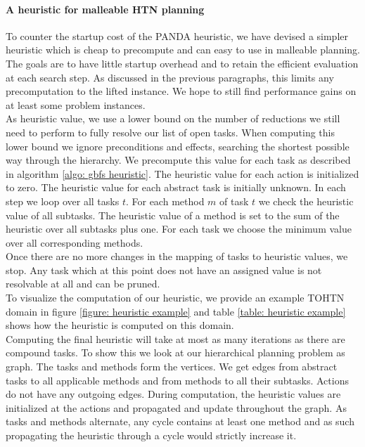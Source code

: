 \paragraph{A heuristic for malleable HTN planning}
To counter the startup cost of the PANDA heuristic, we have devised a simpler heuristic which is cheap to precompute and can easy to use in malleable planning. The goals are to have little startup overhead and to retain the efficient evaluation at each search step. As discussed in the previous paragraphs, this limits any precomputation to the lifted instance. We hope to still find performance gains on at least some problem instances. \\
As heuristic value, we use a lower bound on the number of reductions we still need to perform to fully resolve our list of open tasks. When computing this lower bound we ignore preconditions and effects, searching the shortest possible way through the hierarchy. We precompute this value for each task as described in algorithm \ref{algo: gbfs heuristic}. The heuristic value for each action is initialized to zero. The heuristic value for each abstract task is initially unknown. In each step we loop over all tasks $t$. For each method $m$ of task $t$ we check the heuristic value of all subtasks. The heuristic value of a method is set to the sum of the heuristic over all subtasks plus one. For each task we choose the minimum value over all corresponding methods. \\
Once there are no more changes in the mapping of tasks to heuristic values, we stop. Any task which at this point does not have an assigned value is not resolvable at all and can be pruned. \\
To visualize the computation of our heuristic, we provide an example TOHTN domain in figure \ref{figure: heuristic example} and table \ref{table: heuristic example} shows how the heuristic is computed on this domain. \\
Computing the final heuristic will take at most as many iterations as there are compound tasks. To show this we look at our hierarchical planning problem as graph. The tasks and methods form the vertices. We get edges from abstract tasks to all applicable methods and from methods to all their subtasks. Actions do not have any outgoing edges. During computation, the heuristic values are initialized at the actions and propagated and update throughout the graph. As tasks and methods alternate, any cycle contains at least one method and as such propagating the heuristic through a cycle would strictly increase it.  \\
